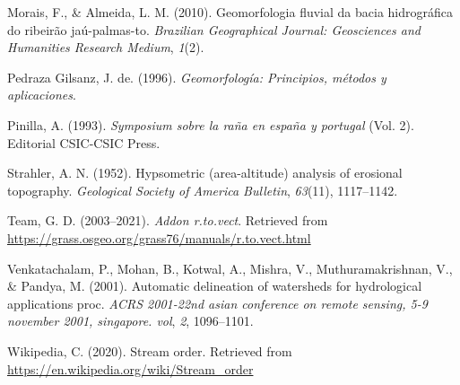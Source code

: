 \documentclass[11pt,]{article}
\begin{document}
\hypertarget{ref-morais2010geomorfologia}{}
Morais, F., \& Almeida, L. M. (2010). Geomorfologia fluvial da bacia
hidrográfica do ribeirão jaú-palmas-to. \emph{Brazilian Geographical
Journal: Geosciences and Humanities Research Medium}, \emph{1}(2).

\hypertarget{ref-pedraza1996geomorfologia}{}
Pedraza Gilsanz, J. de. (1996). \emph{Geomorfología: Principios, métodos
y aplicaciones}.

\hypertarget{ref-pinilla1993symposium}{}
Pinilla, A. (1993). \emph{Symposium sobre la raña en españa y portugal}
(Vol. 2). Editorial CSIC-CSIC Press.

\hypertarget{ref-strahler1952hypsometric}{}
Strahler, A. N. (1952). Hypsometric (area-altitude) analysis of
erosional topography. \emph{Geological Society of America Bulletin},
\emph{63}(11), 1117--1142.

\hypertarget{ref-tovect}{}
Team, G. D. (2003--2021). \emph{Addon r.to.vect}. Retrieved from
\url{https://grass.osgeo.org/grass76/manuals/r.to.vect.html}

\hypertarget{ref-venkatachalam2001automatic}{}
Venkatachalam, P., Mohan, B., Kotwal, A., Mishra, V., Muthuramakrishnan,
V., \& Pandya, M. (2001). Automatic delineation of watersheds for
hydrological applications proc. \emph{ACRS 2001-22nd asian conference on
remote sensing, 5-9 november 2001, singapore. vol}, \emph{2},
1096--1101.

\hypertarget{ref-wikipedia2020stream}{}
Wikipedia, C. (2020). Stream order. Retrieved from
\url{https://en.wikipedia.org/wiki/Stream_order}




\newpage
\singlespacing 
\end{document}
